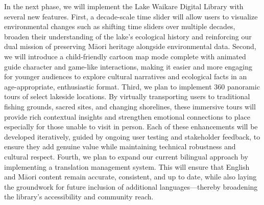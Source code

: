 ﻿%


In the next phase, we will implement the Lake Waikare Digital Library with several new features.
First, a decade-scale time slider will allow users to visualize environmental changes such as shifting time sliders over multiple decades, broaden their understanding of the lake’s ecological history and reinforcing our dual mission of preserving Māori heritage alongside environmental data.
Second, we will introduce a child-friendly cartoon map mode complete with animated guide character and game-like interactions, making it easier and more engaging for younger audiences to explore cultural narratives and ecological facts in an age-appropriate, enthusiastic format.
Third, we plan to implement 360\textdegree{} panoramic tours of select lakeside locations. By virtually transporting users to traditional fishing grounds, sacred sites, and changing shorelines, these immersive tours will provide rich contextual insights and strengthen emotional connections to place especially for those unable to visit in person. Each of these enhancements will be developed iteratively, guided by ongoing user testing and stakeholder feedback, to ensure they add genuine value while maintaining technical robustness and cultural respect. Fourth, we plan to expand our current bilingual approach by implementing a translation management system.
This will ensure that English and Māori content remain accurate, consistent, and up to date, while also laying the groundwork for future inclusion of additional languages—thereby broadening the library’s accessibility and community reach.



